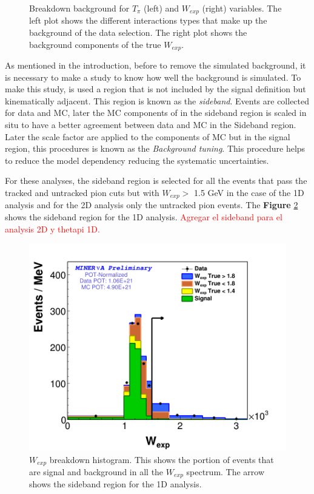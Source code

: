 \begin{figure}[!htb]
    \caption{Breakdown background for $T_\pi$ (left) and $W_{exp}$ (right) variables. The left plot shows the different interactions types that make up the background of the data selection. The right plot shows the background components of the true $W_{exp}$.}
    \label{fig:Analysis:BgStudies:SidebandTunning:BGBreakdownTpiWexp}
\end{figure}

As mentioned in the introduction, before to remove the simulated background, it is necessary to make a study to know how well the background is simulated. To make this study, is used a region that is not included by the signal definition but kinematically adjacent. This region is known as the \textit{sideband}. Events are collected for data and MC, later the MC components of in the sideband region is scaled in situ to have a better agreement between data and MC in the Sideband region. Later the scale factor are applied to the components of MC but in the signal region, this procedures is known as the \textit{Background tuning}. This procedure helps to reduce the model dependency reducing  the systematic uncertainties. 

For these analyses, the sideband region is selected for all the events that pass the tracked and untracked pion cuts but with $W_{exp} > $ 1.5 GeV in the case of the 1D analysis and for the 2D analysis only the untracked pion events. The \textbf{Figure} \ref{fig:Analysis:BgStudies:SidebandTunning:BreakdownWSideband} shows the sideband region for the 1D analysis. \textcolor{red}{Agregar el sideband para el analysis 2D y thetapi 1D.}

\begin{figure}[!htb]
    \centering
    \includegraphics[scale=0.3]{Figures/Chapter4/BGStudies/Breakdown_WSideband_wexp_fit_1Pi_PN_.png}
    \caption{$W_{exp}$ breakdown histogram. This  shows the portion of events that are signal and background in all the $W_{exp}$ spectrum. The arrow shows the sideband region for the 1D analysis.}
    \label{fig:Analysis:BgStudies:SidebandTunning:BreakdownWSideband} 
\end{figure}

